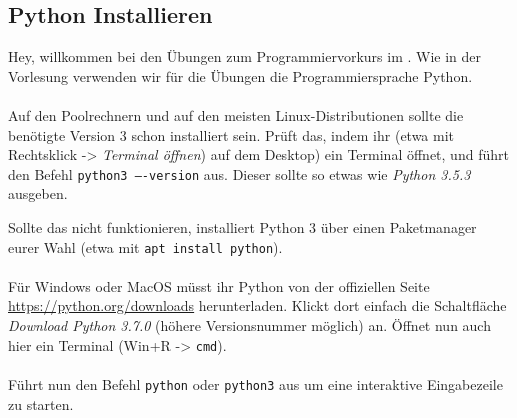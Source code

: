 \subsection{Python Installieren}
Hey, willkommen bei den Übungen zum Programmiervorkurs im \ptitle. Wie in der
Vorlesung verwenden wir für die Übungen die Programmiersprache Python. \\\\
%
Auf den Poolrechnern und auf den meisten Linux-Distributionen sollte die
benötigte Version 3 schon installiert sein. Prüft das, indem ihr (etwa mit
Rechtsklick -> \textit{Terminal öffnen}) auf dem Desktop) ein Terminal öffnet,
und führt den Befehl \texttt{python3 ----version} aus. Dieser sollte so etwas wie
\textit{Python 3.5.3} ausgeben.

Sollte das nicht funktionieren, installiert Python 3 über einen Paketmanager
eurer Wahl (etwa mit \texttt{apt install python}). \\\\
%
Für Windows oder MacOS müsst ihr Python von der offiziellen Seite
\url{https://python.org/downloads} herunterladen. Klickt dort einfach die
Schaltfläche \textit{Download Python 3.7.0} (höhere Versionsnummer möglich) an.
Öffnet nun auch hier ein Terminal (Win+R -> \texttt{cmd}). \\\\
%
Führt nun den Befehl \texttt{python} oder \texttt{python3} aus um eine
interaktive Eingabezeile zu starten.
